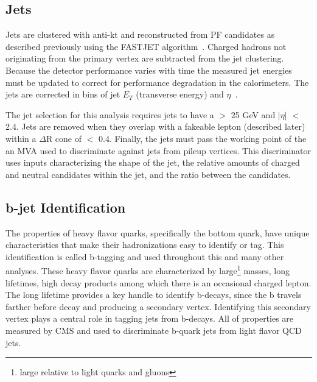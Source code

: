 \subsection{Jets}
Jets are clustered with anti-kt and reconstructed from PF candidates as described previously using the FASTJET algorithm~\cite{antikt}\cite{fastjet}.
Charged hadrons not originating from the primary vertex are subtracted from the jet clustering. Because the detector performance varies with time the measured jet energies
must be updated to correct for performance degradation in the calorimeters. The jets are corrected in bins of jet $E_{T}$ (transverse energy) and $\eta$~\cite{jec}.

The jet selection for this analysis requires jets to have a \pt $>$ 25 GeV and $|\eta|$ $<$ 2.4. Jets are removed when they overlap with a fakeable lepton (described later) within
a $\Delta$R cone of $<$ 0.4. Finally, the jets must pass the working point of the an MVA used to discriminate against jets from pileup vertices. This discriminator uses inputs
characterizing the shape of the jet, the relative amounts of charged and neutral candidates within the jet, and the \pt ratio between the candidates. 

\subsection{b-jet Identification}
The properties of heavy flavor quarks, specifically the bottom quark, have unique characteristics that make their hadronizations easy to identify or tag. This identification is called
b-tagging and used throughout this and many other analyses. These heavy flavor quarks are characterized by large\footnote{large relative to light quarks and gluons} masses,
long lifetimes, high \pt decay products among which there is an occasional charged lepton. The long lifetime provides a key handle to identify b-decays, since the b travels farther before
decay and producing a secondary vertex. Identifying this secondary vertex plays a central role in tagging jets from b-decays. All of properties are measured by CMS and used to discriminate b-quark jets
from light flavor QCD jets. 


